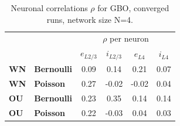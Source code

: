 \documentclass[mphil,deptreport,ianc]{infthesis} %
\begin{document}
\begin{table}
\caption{Neuronal correlations $\rho$ for GBO, converged runs, network size N=4.}
\label{tab:rho_converged_GBO_pop}
\begin{center}
\begin{tabular}{ l l c c c c }
 & & \multicolumn{4}{c}{$\rho$ per neuron} \\
 & & $e_{L2/3}$ & $i_{L2/3}$ & $e_{L4}$ & $i_{L4}$ \\
 \textbf{WN} & \textbf{Bernoulli} & 0.09 & 0.14 & 0.21 & 0.07 \\ 
 \textbf{WN} & \textbf{Poisson} & 0.27 & -0.02 & -0.02 & 0.04 \\  
 \textbf{OU} & \textbf{Bernoulli} & 0.23 & 0.35 & 0.14 & 0.14 \\ 
 \textbf{OU} & \textbf{Poisson} & 0.22 & -0.03 & 0.04 & 0.03 \\  
\end{tabular}
\end{center}
\end{table}




\end{document}
